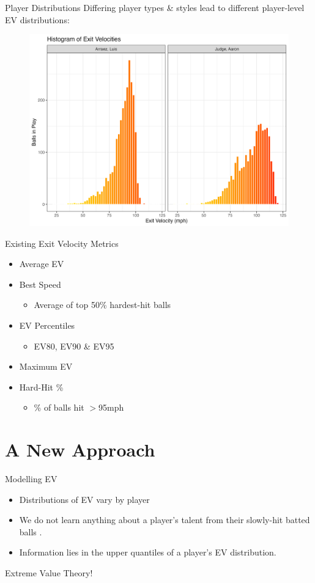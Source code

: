 \documentclass{beamer}
\begin{document}
\begin{frame}{Player Distributions}
    Differing player types \& styles lead to different player-level EV distributions:
    \begin{figure}
        \centering
        \includegraphics[width=0.85\linewidth]{plots/playerComparison.png}
    \end{figure}
\end{frame}

\begin{frame}{Existing Exit Velocity Metrics}
\begin{itemize}
    \item Average EV
    \item Best Speed \cite{tangoBestSpeed}
    \begin{itemize}
        \item Average of top 50\% hardest-hit balls
    \end{itemize}
    \item EV Percentiles \cite{clemensEV}
    \begin{itemize}
        \item EV80, EV90 \& EV95
    \end{itemize}
    \item Maximum EV
    \item Hard-Hit \%
    \begin{itemize}
        \item \% of balls hit $>$95mph
    \end{itemize}
\end{itemize}
\end{frame}

\section{A New Approach}
\begin{frame}{Modelling EV}
    \begin{itemize}
        \item Distributions of EV vary by player
        \item We do not learn anything about a player's talent from their slowly-hit batted balls \cite{tangoBestSpeed}.
        \item Information lies in the upper quantiles of a player's EV distribution. 
    \end{itemize}
    Extreme Value Theory!
\end{frame}
\end{document}
